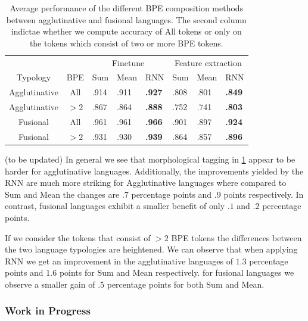 \documentclass[11pt]{article}
\begin{document}
    \begin{table}
        \centering  
        \begin{tabular} {c|cllllll}
            & & \multicolumn{3}{c}{Finetune} & \multicolumn{3}{c}{Feature extraction} \\
            Typology & BPE & Sum & Mean & RNN & Sum & Mean & RNN \\
            \hline
            Agglutinative & All & .914 & .911 & \textbf{.927} & .808 & .801 & \textbf{.849} \\   
            Agglutinative & $>2$ & .867 & .864 & \textbf{.888} & .752 & .741 & \textbf{.803} \\
            Fusional & All & .961 & .961  & \textbf{.966} & .901 & .897 & \textbf{.924} \\
            Fusional & $>2$ & .931 & .930  & \textbf{.939} & .864 & .857 & \textbf{.896} \\
        \end{tabular}
     \caption{Average performance of the different BPE
     composition methods between agglutinative and fusional
     languages. The second column indictae whether we compute accuracy
     of All tokens or only on the tokens which consist of two or more
     BPE tokens. }
     \label{tab:typology_performace}
    \end{table}

    (to be updated)
    In general we see that morphological tagging in
     \cref{tab:typology_performace} appear to be harder for
     agglutinative languages. Additionally, the improvements yielded
     by the RNN are much more striking for Agglutinative languages
     where compared to Sum and Mean the changes are $.7$ percentage
     points and $.9$ points respectively. In contrast, fusional
     languages exhibit a smaller benefit of only $.1$ and $.2$
     percentage points.

        If we consider the tokens that consist of $>2$ BPE tokens the
     differences between the two language typologies are
     heightened. We can observe that when applying RNN we get an
     improvement in the agglutinative languages of $1.3$ percentage
     points and $1.6$ points for Sum and Mean respectively. for
     fusional languages we observe a smaller gain of $.5$ percentage
     points for both Sum and Mean.

         
    
     

    \subsubsection{Work in Progress}
\end{document}
